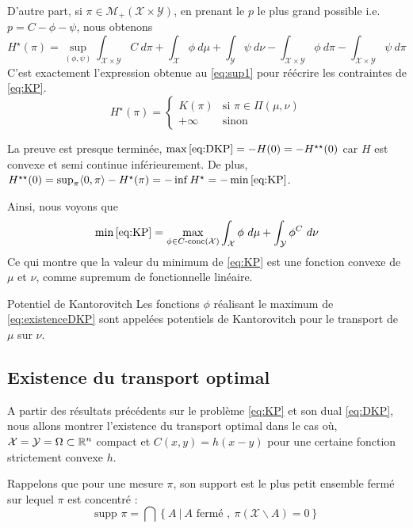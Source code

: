 \documentclass[a4paper,12pt]{article}
\newcommand{\supp}{\text{supp }}
\begin{document}
\begin{preuve}
D'autre part, si $\pi\in\mathcal{M}_+(\mathcal{X}\times\mathcal{Y})$, en prenant le $p$ le plus grand possible i.e. $p=C-\phi-\psi$, nous obtenons 
$$
H^{\star}(\pi)=  \sup_{(\phi,\psi)} \int_{\mathcal{X}\times\mathcal{Y}} C\ d\pi + \int_{\mathcal{X}}\phi\ d\mu + \int_{\mathcal{Y}}\psi\ d\nu - \int_{\mathcal{X}\times\mathcal{Y}} \phi\ d\pi -\int_{\mathcal{X}\times\mathcal{Y}} \psi\ d\pi
$$
C'est exactement l'expression obtenue au \eqref{eq:sup1} pour réécrire les contraintes de \eqref{eq:KP}. 
$$
H^{\star}(\pi)=\left\{
\begin{array}{cl}
K(\pi) & \text{si } \pi \in\Pi(\mu,\nu)\\
+\infty & \text{sinon}
\end{array}
\right.
$$

La preuve est presque terminée, $\max\eqref{eq:DKP} = -H(0) =- H^{\star\star}(0)$ car $H$ est convexe et semi continue inférieurement. De plus, $H^{\star\star}(0)=\sup_{\pi}\langle 0,\pi\rangle-H^{\star}(\pi)=-\inf H^{\star}=-\min\eqref{eq:KP}$.
\end{preuve}

Ainsi, nous voyons que 
$$
\min\eqref{eq:KP}= \max_{\phi\in C\text{-conc}(\mathcal{X})}\int_{\mathcal{X}}\phi\ d\mu +\int_{\mathcal{Y}} \phi^C\ d\nu
$$
Ce qui montre que la valeur du minimum de \eqref{eq:KP} est une fonction convexe de $\mu$ et $\nu$, comme supremum de fonctionnelle linéaire. 
\begin{definition}{Potentiel de Kantorovitch}
Les fonctions $\phi$ réalisant le maximum de \eqref{eq:existenceDKP} sont appelées potentiels de Kantorovitch pour le transport de $\mu$ sur $\nu$.
\end{definition}

\subsection{Existence du transport optimal}

A partir des résultats précédents sur le problème \eqref{eq:KP} et son dual \eqref{eq:DKP}, nous allons montrer l'existence du transport optimal dans le cas où, $\mathcal{X}=\mathcal{Y}=\Omega\subset\mathbb{R}^n$ compact et $C(x,y)=h(x-y)$ pour une certaine fonction strictement convexe $h$. 

Rappelons que pour une mesure $\pi$, son support est le plus petit ensemble fermé sur lequel $\pi$ est concentré : 
$$
\supp \pi = \bigcap \left\{A\ |\ A \text{ fermé },\ \pi(\mathcal{X}\backslash A) = 0 \right\}
$$
\end{document}
